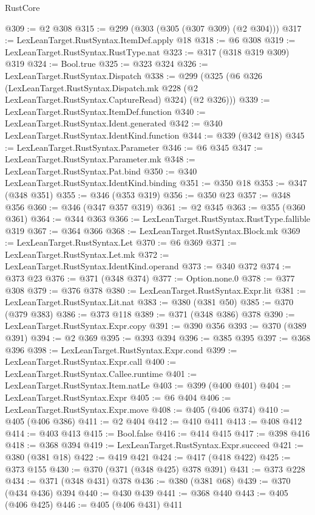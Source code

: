 \begin{lexlean}{RustCore}
\begin{coremodule}
@309 := @2 @308
@315 := @299 (@303 (@305 (@307 @309) (@2 @304)))
@317 := LexLeanTarget.RustSyntax.ItemDef.apply @18
@318 := @6 @308
@319 := LexLeanTarget.RustSyntax.RustType.nat
@323 := @317 (@318 @319 @309) @319
@324 := Bool.true
@325 := @323 @324
@326 := LexLeanTarget.RustSyntax.Dispatch
@338 := @299
    (@325
      (@6
        @326
        (LexLeanTarget.RustSyntax.Dispatch.mk @228 (@2 LexLeanTarget.RustSyntax.CaptureRead) @324)
        (@2 @326)))
@339 := LexLeanTarget.RustSyntax.ItemDef.function
@340 := LexLeanTarget.RustSyntax.Ident.generated
@342 := @340 LexLeanTarget.RustSyntax.IdentKind.function
@344 := @339 (@342 @18)
@345 := LexLeanTarget.RustSyntax.Parameter
@346 := @6 @345
@347 := LexLeanTarget.RustSyntax.Parameter.mk
@348 := LexLeanTarget.RustSyntax.Pat.bind
@350 := @340 LexLeanTarget.RustSyntax.IdentKind.binding
@351 := @350 @18
@353 := @347 (@348 @351)
@355 := @346 (@353 @319)
@356 := @350 @23
@357 := @348 @356
@360 := @346 (@347 @357 @319)
@361 := @2 @345
@363 := @355 (@360 @361)
@364 := @344 @363
@366 := LexLeanTarget.RustSyntax.RustType.fallible @319
@367 := @364 @366
@368 := LexLeanTarget.RustSyntax.Block.mk
@369 := LexLeanTarget.RustSyntax.Let
@370 := @6 @369
@371 := LexLeanTarget.RustSyntax.Let.mk
@372 := LexLeanTarget.RustSyntax.IdentKind.operand
@373 := @340 @372
@374 := @373 @23
@376 := @371 (@348 @374)
@377 := Option.none.{0}
@378 := @377 @308
@379 := @376 @378
@380 := LexLeanTarget.RustSyntax.Expr.lit
@381 := LexLeanTarget.RustSyntax.Lit.nat
@383 := @380 (@381 @50)
@385 := @370 (@379 @383)
@386 := @373 @118
@389 := @371 (@348 @386) @378
@390 := LexLeanTarget.RustSyntax.Expr.copy
@391 := @390 @356
@393 := @370 (@389 @391)
@394 := @2 @369
@395 := @393 @394
@396 := @385 @395
@397 := @368 @396
@398 := LexLeanTarget.RustSyntax.Expr.cond
@399 := LexLeanTarget.RustSyntax.Expr.call
@400 := LexLeanTarget.RustSyntax.Callee.runtime
@401 := LexLeanTarget.RustSyntax.Item.natLe
@403 := @399 (@400 @401)
@404 := LexLeanTarget.RustSyntax.Expr
@405 := @6 @404
@406 := LexLeanTarget.RustSyntax.Expr.move
@408 := @405 (@406 @374)
@410 := @405 (@406 @386)
@411 := @2 @404
@412 := @410 @411
@413 := @408 @412
@414 := @403 @413
@415 := Bool.false
@416 := @414 @415
@417 := @398 @416
@418 := @368 @394
@419 := LexLeanTarget.RustSyntax.Expr.succeed
@421 := @380 (@381 @18)
@422 := @419 @421
@424 := @417 (@418 @422)
@425 := @373 @155
@430 := @370 (@371 (@348 @425) @378 @391)
@431 := @373 @228
@434 := @371 (@348 @431) @378
@436 := @380 (@381 @68)
@439 := @370 (@434 @436) @394
@440 := @430 @439
@441 := @368 @440
@443 := @405 (@406 @425)
@446 := @405 (@406 @431) @411

\end{coremodule}
\end{lexlean}
